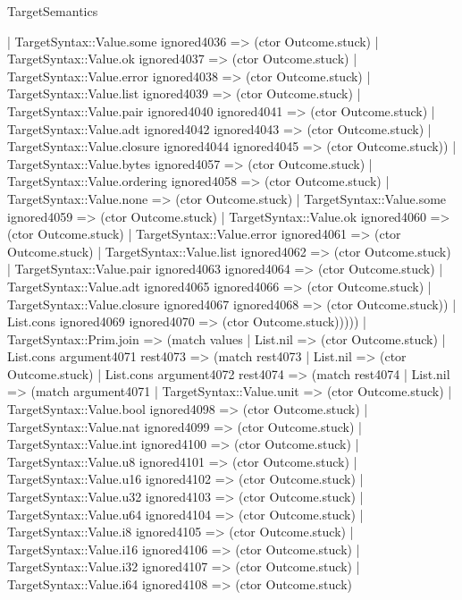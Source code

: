 \begin{lexlean}{TargetSemantics}
\begin{semanticmodule}
{                | TargetSyntax::Value.some ignored4036 => (ctor Outcome.stuck)
                | TargetSyntax::Value.ok ignored4037 => (ctor Outcome.stuck)
                | TargetSyntax::Value.error ignored4038 => (ctor Outcome.stuck)
                | TargetSyntax::Value.list ignored4039 => (ctor Outcome.stuck)
                | TargetSyntax::Value.pair ignored4040 ignored4041 => (ctor Outcome.stuck)
                | TargetSyntax::Value.adt ignored4042 ignored4043 => (ctor Outcome.stuck)
                | TargetSyntax::Value.closure ignored4044 ignored4045 => (ctor Outcome.stuck))
              | TargetSyntax::Value.bytes ignored4057 => (ctor Outcome.stuck)
              | TargetSyntax::Value.ordering ignored4058 => (ctor Outcome.stuck)
              | TargetSyntax::Value.none => (ctor Outcome.stuck)
              | TargetSyntax::Value.some ignored4059 => (ctor Outcome.stuck)
              | TargetSyntax::Value.ok ignored4060 => (ctor Outcome.stuck)
              | TargetSyntax::Value.error ignored4061 => (ctor Outcome.stuck)
              | TargetSyntax::Value.list ignored4062 => (ctor Outcome.stuck)
              | TargetSyntax::Value.pair ignored4063 ignored4064 => (ctor Outcome.stuck)
              | TargetSyntax::Value.adt ignored4065 ignored4066 => (ctor Outcome.stuck)
              | TargetSyntax::Value.closure ignored4067 ignored4068 => (ctor Outcome.stuck))
            | List.cons ignored4069 ignored4070 => (ctor Outcome.stuck)))))
    | TargetSyntax::Prim.join => (match values
      | List.nil => (ctor Outcome.stuck)
      | List.cons argument4071 rest4073 => (match rest4073
        | List.nil => (ctor Outcome.stuck)
        | List.cons argument4072 rest4074 => (match rest4074
          | List.nil => (match argument4071
            | TargetSyntax::Value.unit => (ctor Outcome.stuck)
            | TargetSyntax::Value.bool ignored4098 => (ctor Outcome.stuck)
            | TargetSyntax::Value.nat ignored4099 => (ctor Outcome.stuck)
            | TargetSyntax::Value.int ignored4100 => (ctor Outcome.stuck)
            | TargetSyntax::Value.u8 ignored4101 => (ctor Outcome.stuck)
            | TargetSyntax::Value.u16 ignored4102 => (ctor Outcome.stuck)
            | TargetSyntax::Value.u32 ignored4103 => (ctor Outcome.stuck)
            | TargetSyntax::Value.u64 ignored4104 => (ctor Outcome.stuck)
            | TargetSyntax::Value.i8 ignored4105 => (ctor Outcome.stuck)
            | TargetSyntax::Value.i16 ignored4106 => (ctor Outcome.stuck)
            | TargetSyntax::Value.i32 ignored4107 => (ctor Outcome.stuck)
            | TargetSyntax::Value.i64 ignored4108 => (ctor Outcome.stuck)
}
\end{semanticmodule}
\end{lexlean}
